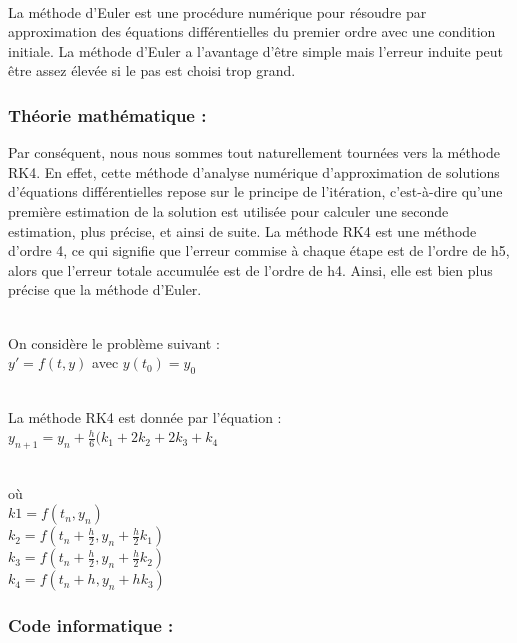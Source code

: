 \documentclass{article}
\begin{document}
        \\

         La méthode d'Euler est une procédure numérique pour résoudre par approximation des équations différentielles du premier ordre avec une condition initiale. La méthode d'Euler a l'avantage d'être simple mais l'erreur induite peut être assez élevée si le pas est choisi trop grand.

        \subsubsection{Théorie mathématique :}

            Par conséquent, nous nous sommes tout naturellement tournées vers la méthode RK4. En effet, cette méthode d'analyse numérique d'approximation de solutions d'équations différentielles repose sur le principe de l'itération, c'est-à-dire qu'une première estimation de la solution est utilisée pour calculer une seconde estimation, plus précise, et ainsi de suite. La méthode RK4 est une méthode d'ordre 4, ce qui signifie que l'erreur commise à chaque étape est de l'ordre de h5, alors que l'erreur totale accumulée est de l'ordre de h4. Ainsi, elle est bien plus précise que la méthode d'Euler.

            \\

            On considère le problème suivant : \\

            $y' = f(t,y)$ avec $y(t_0) = y_0$

            \\

            La méthode RK4 est donnée par l'équation : \\

            $y_{n+1} = y_n + \frac{h}{6} (k_1 + 2k_2 + 2k_3 + k_4$

            \\

            où \\

            $k1 = f(t_n, y_n)$ \\
            $k_2 = f(t_n + \frac{h}{2}, y_n + \frac{h}{2} k_1)$ \\
            $k_3 = f(t_n + \frac{h}{2}, y_n + \frac{h}{2} k_2)$ \\
            $k_4 = f(t_n + h, y_n + hk_3)$

        \subsubsection{Code informatique :}
\end{document}
